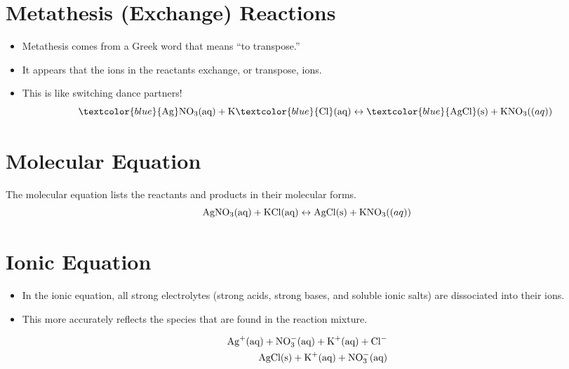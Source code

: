 \documentclass[
	chapter=4
]{chem122notes}
\begin{document}
\section{Metathesis (Exchange) Reactions}\label{sec:metathesis-(exchange)-reactions}
\begin{itemize}
	\item Metathesis comes from a Greek word that means ``to transpose.''
	\item It appears that the ions in the reactants exchange, or transpose, ions.
	\item This is like switching dance partners!
	\[ \textcolor{blue}{\element{Ag}}\element{N}\element{O}[3] (\mbox{aq}) + \element{K}\textcolor{blue}{\element{Cl}} (\mbox{aq}) \leftrightarrow \textcolor{blue}{\element{Ag}\element{Cl}} (\mbox{s}) + \element{K}\element{N}\element{O}[3] (\mbox(aq)) \]
\end{itemize}

\section{Molecular Equation}\label{sec:molecular-equation}
The molecular equation lists the reactants and products in their molecular forms.
\[ \element{Ag}\element{N}\element{O}[3] (\mbox{aq}) + \element{K}\element{Cl} (\mbox{aq}) \leftrightarrow \element{Ag}\element{Cl} (\mbox{s}) + \element{K}\element{N}\element{O}[3] (\mbox(aq)) \]

\section{Ionic Equation}\label{sec:ionic-equation}
\begin{itemize}
	\item In the ionic equation, all strong electrolytes (strong acids, strong bases, and soluble ionic salts) are dissociated into their ions.
	\item This more accurately reflects the species that are found in the reaction mixture.
\end{itemize}

\begin{equation*}
\begin{aligned}
	\element{Ag}^{+} (\mbox{aq}) + \element{N}\element{O}[3]^{-} (\mbox{aq}) + \element{K}^{+} (\mbox{aq}) + \element{Cl}^{-}\\
	\element{Ag}\element{Cl} (\mbox{s}) + \element{K}^{+} (\mbox{aq}) + \element{N}\element{O}[3]^{-} (\mbox{aq})\\
\end{aligned}
\end{equation*}
\end{document}

